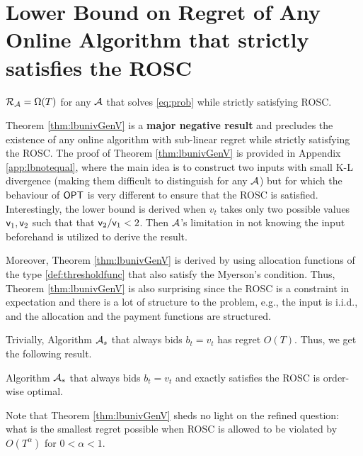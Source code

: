 \section{Lower Bound on Regret of Any Online Algorithm that strictly satisfies the ROSC}\label{sec:gen}
\begin{theorem}\label{thm:lbunivGenV}
$\mathcal{R}_{\mathcal{A}}  = \Omega(T)$ for any $\mathcal{A}$ that solves \eqref{eq:prob} while strictly satisfying ROSC.
\end{theorem}
Theorem \ref{thm:lbunivGenV} is a {\bf major negative result} and precludes the existence of any online algorithm with sub-linear regret while 
strictly satisfying the ROSC.
The proof of Theorem \ref{thm:lbunivGenV} is provided in Appendix \ref{app:lbnotequal}, 
where the main idea is to construct two inputs 
with small K-L divergence (making them difficult to distinguish for any $\mathcal{A}$) but for which the behaviour of $\mathsf{OPT}$ is very different to ensure that the 
ROSC is satisfied. Interestingly, the lower bound is derived when $v_t$ takes only two possible values ${\mathsf{v}}_1, {\mathsf{v}}_2$ such that that ${\mathsf{v}}_2/{\mathsf{v}}_1<2$. Then $\mathcal{A}$'s limitation in not knowing the input beforehand is utilized to derive the result. 

Moreover, Theorem \ref{thm:lbunivGenV} is derived by using allocation functions of the type \eqref{def:thresholdfunc} that also satisfy the Myerson's condition. Thus, Theorem \ref{thm:lbunivGenV} is also surprising since the ROSC is a constraint in expectation and there is a lot of structure to the problem, e.g., the input is i.i.d., and the allocation and the payment functions are structured. 

Trivially, Algorithm $\mathcal{A}_s$ that always bids $b_t=v_t$ has regret $O(T)$. Thus, we get the following result.
\begin{corollary} Algorithm $\mathcal{A}_s$ that always bids $b_t=v_t$ and exactly satisfies the ROSC is order-wise optimal.
\end{corollary}

\begin{rem} Note that Theorem \ref{thm:lbunivGenV} sheds no light on the refined question: what is the smallest regret possible when ROSC is allowed to be violated by $O(T^\alpha)$ for $0< \alpha<1$.
\end{rem}

